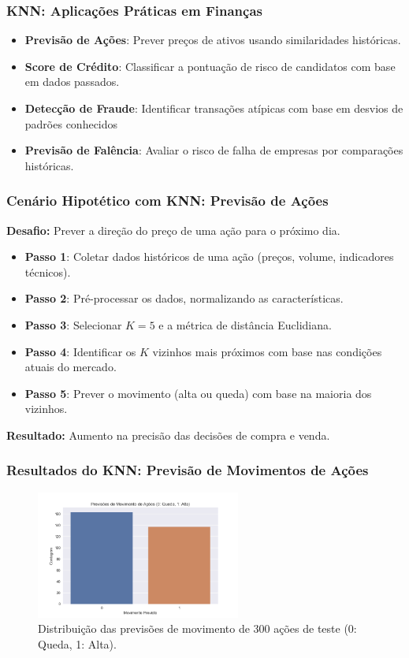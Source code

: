 \documentclass{beamer}
\begin{document}
\begin{frame}
    \frametitle{KNN: Aplicações Práticas em Finanças}
    \begin{itemize}
        \item \textbf{Previsão de Ações}: Prever preços de ativos usando similaridades históricas.
        \item \textbf{Score de Crédito}: Classificar a pontuação de risco de candidatos com base em dados passados.
        \item \textbf{Detecção de Fraude}: Identificar transações atípicas com base em desvios de padrões conhecidos
        \item \textbf{Previsão de Falência}: Avaliar o risco de falha de empresas por comparações históricas.
    \end{itemize}
\end{frame}

\begin{frame}
    \frametitle{Cenário Hipotético com KNN: Previsão de Ações}
    \textbf{Desafio:} Prever a direção do preço de uma ação para o próximo dia.
    \begin{itemize}
        \item \textbf{Passo 1}: Coletar dados históricos de uma ação (preços, volume, indicadores técnicos).
        \item \textbf{Passo 2}: Pré-processar os dados, normalizando as características.
        \item \textbf{Passo 3}: Selecionar \( K = 5 \) e a métrica de distância Euclidiana.
        \item \textbf{Passo 4}: Identificar os \( K \) vizinhos mais próximos com base nas condições atuais do mercado.
        \item \textbf{Passo 5}: Prever o movimento (alta ou queda) com base na maioria dos vizinhos.
    \end{itemize}
    \textbf{Resultado:} Aumento na precisão das decisões de compra e venda.
\end{frame}

\begin{frame}
    \frametitle{Resultados do KNN: Previsão de Movimentos de Ações}
    \begin{figure}
        \centering
        \includegraphics[width=0.6\textwidth]{imagens/stock_prediction.png}
        \caption{Distribuição das previsões de movimento de 300 ações de teste (0: Queda, 1: Alta).}
    \end{figure}

\end{frame}
\end{document}
